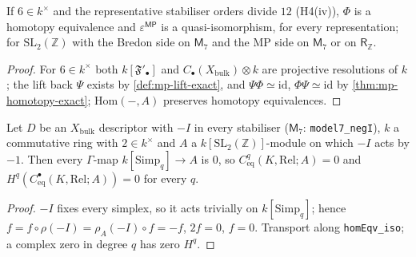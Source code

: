 \begin{theorem}\label{thm:mp-epsmp-quasiiso}
  \leanok
  If $6\in k^\times$ and the representative stabiliser orders divide $12$ (H4(iv)), $\Phi$ is a homotopy equivalence and
  $\varepsilon^{\mathsf{MP}}$ is a quasi-isomorphism, for every representation; for $\mathrm{SL}_2(\mathbb Z)$ with the Bredon side on $\mathsf M_7$
  and the MP side on $\mathsf M_7$ or on $\mathsf R_{\mathbb Z}$.
\end{theorem}
\begin{proof}
  \leanok
  For $6\in k^\times$ both $k[\mathfrak F'_\bullet]$ and $C_\bullet(X_{\mathrm{bulk}})\otimes k$ are projective resolutions of $k$; the lift back
  $\Psi$ exists by \ref{def:mp-lift-exact}, and $\Psi\Phi\simeq\mathrm{id}$, $\Phi\Psi\simeq\mathrm{id}$ by \ref{thm:mp-homotopy-exact};
  $\mathrm{Hom}(-,A)$ preserves homotopy equivalences.
\end{proof}

\begin{theorem}\label{thm:mp-bredon-zero}
  \leanok
  Let $D$ be an $X_{\mathrm{bulk}}$ descriptor with $-I$ in every stabiliser ($\mathsf M_7$: \texttt{model7\_negI}), $k$ a
  commutative ring with $2\in k^\times$ and $A$ a $k[\mathrm{SL}_2(\mathbb Z)]$-module on which $-I$ acts by $-1$.  Then every
  $\Gamma$-map $k[\mathrm{Simp}_q]\to A$ is $0$, so $C^q_{\mathrm{eq}}(K,\mathrm{Rel};A)=0$ and $H^q(C^\bullet_{\mathrm{eq}}(K,\mathrm{Rel};A))=0$
  for every $q$.
\end{theorem}
\begin{proof}
  \leanok
  $-I$ fixes every simplex, so it acts trivially on $k[\mathrm{Simp}_q]$; hence $f=f\circ\rho(-I)=\rho_A(-I)\circ f=-f$, $2f=0$,
  $f=0$.  Transport along \texttt{homEqv\_iso}; a complex zero in degree $q$ has zero $H^q$.
\end{proof}

